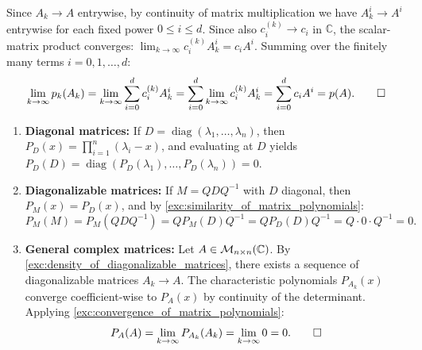 \begin{exercisesolution}
\label{sol:convergence_of_matrix_polynomials}
Since $A_k \to A$ entrywise, by continuity of matrix multiplication we have $A_k^i \to A^i$ entrywise for each fixed power $0 \le i \le d$.
Since also $c_i^{(k)} \to c_i$ in $\mathbb{C}$, the scalar-matrix product converges: $\lim_{k \to \infty} c_i^{(k)} A_k^i = c_i A^i$.
Summing over the finitely many terms $i = 0, 1, \dots, d$:
\[
\lim_{k \to \infty} p_k(A_k) = \lim_{k \to \infty} \sum_{i=0}^d c_i^{(k)} A_k^i = \sum_{i=0}^d \lim_{k \to \infty} c_i^{(k)} A_k^i = \sum_{i=0}^d c_i A^i = p(A). \qedhere
\]
\end{exercisesolution}

\begin{exercisesolution}
\label{sol:cayley_hamilton_via_density}
\begin{enumerate}
    \item \textbf{Diagonal matrices:} If $D = \operatorname{diag}(\lambda_1, \dots, \lambda_n)$, then $P_D(x) = \prod_{i=1}^n (\lambda_i - x)$, and evaluating at $D$ yields $P_D(D) = \operatorname{diag}(P_D(\lambda_1), \dots, P_D(\lambda_n)) = 0$.
    \item \textbf{Diagonalizable matrices:} If $M = Q D Q^{-1}$ with $D$ diagonal, then $P_M(x) = P_D(x)$, and by \cref{exc:similarity_of_matrix_polynomials}:
    \[
    P_M(M) = P_M(Q D Q^{-1}) = Q P_M(D) Q^{-1} = Q P_D(D) Q^{-1} = Q \cdot 0 \cdot Q^{-1} = 0.
    \]
    \item \textbf{General complex matrices:} Let $A \in \mathcal{M}_{n \times n}(\mathbb{C})$. By \cref{exc:density_of_diagonalizable_matrices}, there exists a sequence of diagonalizable matrices $A_k \to A$.
    The characteristic polynomials $P_{A_k}(x)$ converge coefficient-wise to $P_A(x)$ by continuity of the determinant.
    Applying \cref{exc:convergence_of_matrix_polynomials}:
    \[
    P_A(A) = \lim_{k \to \infty} P_{A_k}(A_k) = \lim_{k \to \infty} 0 = 0. \qedhere
    \]
\end{enumerate}
\end{exercisesolution}

